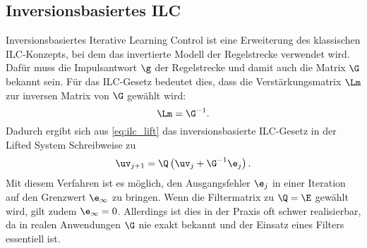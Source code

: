 \subsection{Inversionsbasiertes ILC}
Inversionsbasiertes Iterative Learning Control ist eine Erweiterung des klassischen ILC-Konzepts, bei dem das invertierte Modell der Regelstrecke verwendet wird. Dafür muss die Impulsantwort $\g$ der Regelstrecke und damit auch die Matrix $\G$ bekannt sein. Für das ILC-Gesetz bedeutet dies, dass die Verstärkungsmatrix $\Lm$ zur inversen Matrix von $\G$ gewählt wird: 
\begin{equation}
	\label{eq:L_Ginv}
	\Lm = \G^{-1}.
\end{equation}
Dadurch ergibt sich aus \autoref{eq:ilc_lift} das inversionsbasierte ILC-Gesetz in der Lifted System Schreibweise zu
\begin{equation}
	\label{eq:ilc_G}
	\uv_{j+1} = \Q \left( \uv_j + \G^{-1} \e_j \right).
\end{equation}
Mit diesem Verfahren ist es möglich, den Ausgangsfehler $\e_j$ in einer Iteration auf den Grenzwert $\e_{\infty}$ zu bringen. Wenn die Filtermatrix zu $\Q = \E$ gewählt wird, gilt zudem $\e_{\infty} = 0$. Allerdings ist dies in der Praxis oft schwer realisierbar, da in realen Anwendungen $\G$ nie exakt bekannt und der Einsatz eines Filters essentiell ist.

